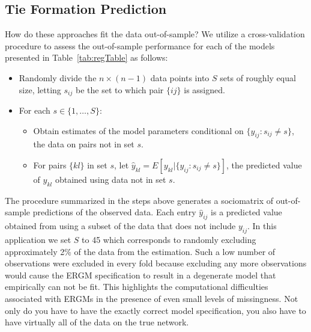 \documentclass[12pt,pdflatex]{elsarticle}
\begin{document}
\subsection{Tie Formation Prediction}

How do these approaches fit the data out-of-sample? We utilize a cross-validation procedure to assess the out-of-sample performance for each of the models presented in Table~\ref{tab:regTable} as follows:

\begin{itemize}
	\item Randomly divide the $n \times (n-1)$ data points into $S$ sets of roughly equal size, letting $s_{ij}$ be the set to which pair $\{ij\}$ is assigned.
	\item For each $s \in \{1, \ldots, S\}$:
	\begin{itemize}
		\item Obtain estimates of the model parameters conditional on $\{y_{ij} : s_{ij} \neq s\}$, the data on pairs not in set $s$.
		\item For pairs $\{kl\}$ in set $s$, let $\hat y_{kl} = E[y_{kl} | \{y_{ij} : s_{ij} \neq s\}]$, the predicted value of $y_{kl}$ obtained using data not in set $s$.
	\end{itemize}
\end{itemize}

The procedure summarized in the steps above generates a sociomatrix of out-of-sample predictions of the observed data. Each entry $\hat y_{ij}$ is a predicted value obtained from using a subset of the data that does not include $y_{ij}$. In this application we set $S$ to 45 which corresponds to randomly excluding approximately 2\% of the data from the estimation. Such a low number of observations were excluded in every fold because excluding any more observations would cause the ERGM specification to result in a degenerate model that empirically can not be fit. This highlights the computational difficulties associated with ERGMs in the presence of even small levels of missingness.  Not only do you have to have the exactly correct model specification, you also have to have virtually all of the data on the true network.
\end{document}
